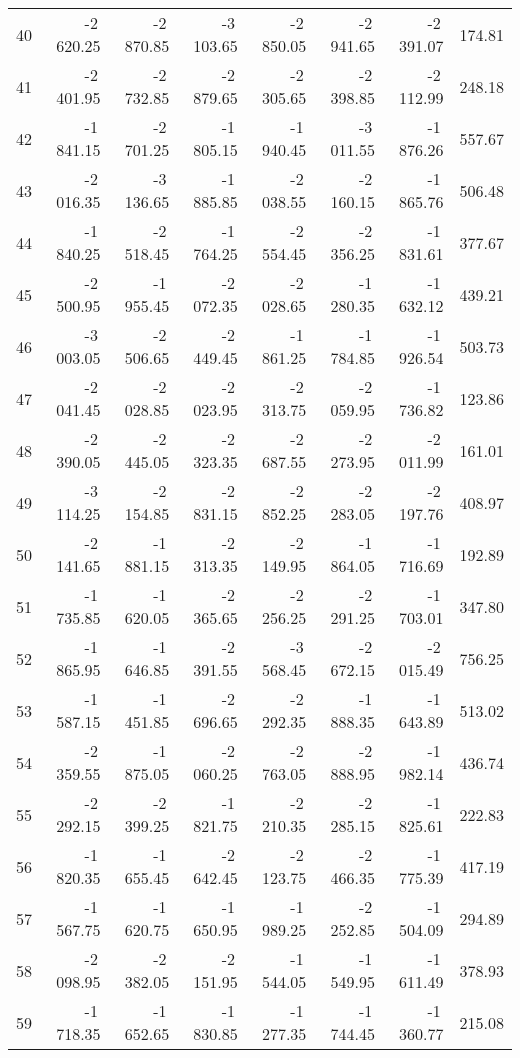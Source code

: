 \begin{longtable}{rrrrrrrr}
40 & -2\,620.25 & -2\,870.85 & -3\,103.65 & -2\,850.05 & -2\,941.65 & -2\,391.07 & 174.81  \\
41 & -2\,401.95 & -2\,732.85 & -2\,879.65 & -2\,305.65 & -2\,398.85 & -2\,112.99 & 248.18  \\
42 & -1\,841.15 & -2\,701.25 & -1\,805.15 & -1\,940.45 & -3\,011.55 & -1\,876.26 & 557.67  \\
43 & -2\,016.35 & -3\,136.65 & -1\,885.85 & -2\,038.55 & -2\,160.15 & -1\,865.76 & 506.48  \\
44 & -1\,840.25 & -2\,518.45 & -1\,764.25 & -2\,554.45 & -2\,356.25 & -1\,831.61 & 377.67  \\
45 & -2\,500.95 & -1\,955.45 & -2\,072.35 & -2\,028.65 & -1\,280.35 & -1\,632.12 & 439.21  \\
46 & -3\,003.05 & -2\,506.65 & -2\,449.45 & -1\,861.25 & -1\,784.85 & -1\,926.54 & 503.73  \\
47 & -2\,041.45 & -2\,028.85 & -2\,023.95 & -2\,313.75 & -2\,059.95 & -1\,736.82 & 123.86  \\
48 & -2\,390.05 & -2\,445.05 & -2\,323.35 & -2\,687.55 & -2\,273.95 & -2\,011.99 & 161.01  \\
49 & -3\,114.25 & -2\,154.85 & -2\,831.15 & -2\,852.25 & -2\,283.05 & -2\,197.76 & 408.97  \\
50 & -2\,141.65 & -1\,881.15 & -2\,313.35 & -2\,149.95 & -1\,864.05 & -1\,716.69 & 192.89  \\
51 & -1\,735.85 & -1\,620.05 & -2\,365.65 & -2\,256.25 & -2\,291.25 & -1\,703.01 & 347.80  \\
52 & -1\,865.95 & -1\,646.85 & -2\,391.55 & -3\,568.45 & -2\,672.15 & -2\,015.49 & 756.25  \\
53 & -1\,587.15 & -1\,451.85 & -2\,696.65 & -2\,292.35 & -1\,888.35 & -1\,643.89 & 513.02  \\
54 & -2\,359.55 & -1\,875.05 & -2\,060.25 & -2\,763.05 & -2\,888.95 & -1\,982.14 & 436.74  \\
55 & -2\,292.15 & -2\,399.25 & -1\,821.75 & -2\,210.35 & -2\,285.15 & -1\,825.61 & 222.83  \\
56 & -1\,820.35 & -1\,655.45 & -2\,642.45 & -2\,123.75 & -2\,466.35 & -1\,775.39 & 417.19  \\
57 & -1\,567.75 & -1\,620.75 & -1\,650.95 & -1\,989.25 & -2\,252.85 & -1\,504.09 & 294.89  \\
58 & -2\,098.95 & -2\,382.05 & -2\,151.95 & -1\,544.05 & -1\,549.95 & -1\,611.49 & 378.93  \\
59 & -1\,718.35 & -1\,652.65 & -1\,830.85 & -1\,277.35 & -1\,744.45 & -1\,360.77 & 215.08  \\

\end{longtable}
